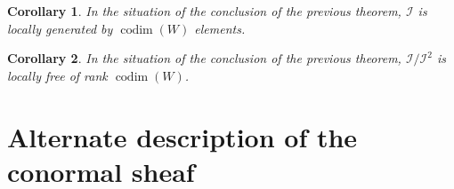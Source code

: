 \documentclass[a4paper]{article}
\newtheorem{thm}{Theorem}[section]
\newtheorem{cor}[thm]{Corollary}
\newcommand{\codim}{\operatorname{codim}}
\newcommand{\conormal}{\mathscr{I} / \mathscr{I}^{2}}
\begin{document}
\begin{cor}
	In the situation of the conclusion of the previous theorem, 
	\(\mathscr{I}\) is locally generated by 
	\(\codim(W)\) elements.
\end{cor}

\begin{cor}
	In the situation of the conclusion of the previous theorem,
	\(\conormal\) is locally free of rank \(\codim(W)\).
\end{cor}


%
%
%
%
%
%





\section{Alternate description of the conormal sheaf}
\end{document}
